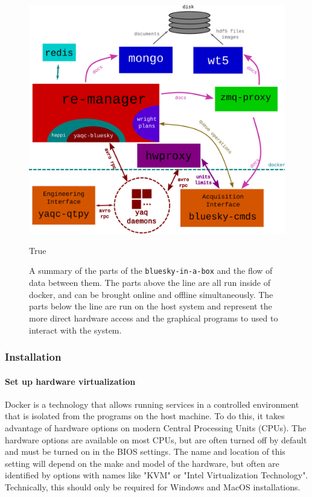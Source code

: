 \begin{figure}
\includegraphics[width=7in]{"acquisition/images/bluesky-in-a-box-architecture"}
\caption[\texttt{bluesky-in-a-box} architecture]{
A summary of the parts of the \texttt{bluesky-in-a-box} and the flow of data between them.
The parts above the line are all run inside of docker, and can be brought online and offline simultaneously.
The parts below the line are run on the host system and represent the more direct hardware access and the graphical programs to used to interact with the system.
}
True
\label{acq:fig:biab_arch}
\end{figure}

\subsubsection{Installation}
\label{biab-install}

\paragraph{Set up hardware virtualization}

Docker is a technology that allows running services in a controlled environment that is isolated from the programs on the host machine.
To do this, it takes advantage of hardware options on modern Central Processing Units (CPUs).
The hardware options are available on most CPUs, but are often turned off by default and must be turned on in the BIOS settings.
The name and location of this setting will depend on the make and model of the hardware, but often are identified by options with names like "KVM" or "Intel Virtualization Technology".
Technically, this should only be required for Windows and MacOS installations.

